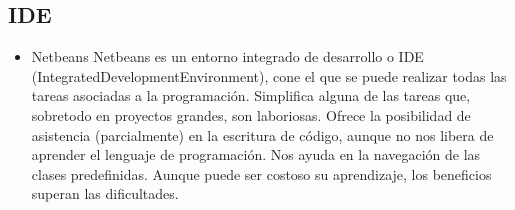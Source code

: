 	\subsection{IDE}
	\begin{itemize}
		\item  Netbeans 
		\label{Herramientas}
		\newline
		Netbeans es un entorno integrado de desarrollo o IDE (IntegratedDevelopmentEnvironment), cone el que se puede realizar todas las tareas asociadas a la programación.
		\newline
		Simplifica alguna de las tareas que, sobretodo en proyectos grandes, son laboriosas. Ofrece la posibilidad de asistencia (parcialmente) en la escritura de código, aunque no nos libera de aprender el lenguaje de programación.
		Nos ayuda en la navegación de las clases predefinidas.
		Aunque puede ser costoso su aprendizaje, los beneficios superan las dificultades.
		

\end{itemize}
